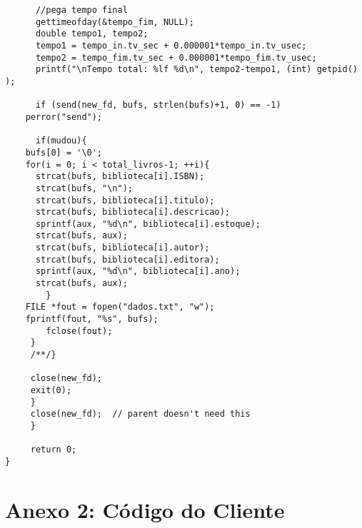\documentclass[11pt, brazil]{article} %
\begin{document}
\begin{verbatim}
      //pega tempo final
      gettimeofday(&tempo_fim, NULL);
      double tempo1, tempo2;
      tempo1 = tempo_in.tv_sec + 0.000001*tempo_in.tv_usec;
      tempo2 = tempo_fim.tv_sec + 0.000001*tempo_fim.tv_usec;
      printf("\nTempo total: %lf %d\n", tempo2-tempo1, (int) getpid() );
				
      if (send(new_fd, bufs, strlen(bufs)+1, 0) == -1)
	perror("send");
					
      if(mudou){
	bufs[0] = '\0';
   	for(i = 0; i < total_livros-1; ++i){
   	  strcat(bufs, biblioteca[i].ISBN);
   	  strcat(bufs, "\n");
   	  strcat(bufs, biblioteca[i].titulo);
   	  strcat(bufs, biblioteca[i].descricao);
   	  sprintf(aux, "%d\n", biblioteca[i].estoque);
   	  strcat(bufs, aux);
   	  strcat(bufs, biblioteca[i].autor);
   	  strcat(bufs, biblioteca[i].editora);
   	  sprintf(aux, "%d\n", biblioteca[i].ano);
   	  strcat(bufs, aux);			
    	}
  	FILE *fout = fopen("dados.txt", "w");
   	fprintf(fout, "%s", bufs);
    	fclose(fout);
     }
     /**/}
						
     close(new_fd);
     exit(0);
     }
     close(new_fd);  // parent doesn't need this
     }

     return 0;
}
\end{verbatim}

\section*{Anexo 2: Código do Cliente}
\end{document}
